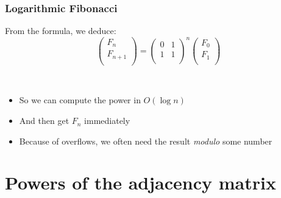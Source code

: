 \documentclass[12pt]{beamer}
\begin{document}
\begin{frame}
\frametitle{Logarithmic Fibonacci}
From the formula, we deduce:
\[
\left(
\begin{array}{cc}
F_n\\
F_{n+1}\\
\end{array}
\right)
=
\left(
\begin{array}{cc}
0&1\\
1&1\\
\end{array}
\right)^n
\left(
\begin{array}{cc}
F_0\\
F_1\\
\end{array}
\right)
\]

~

\begin{itemize}
\item So we can compute the power in $O(\log n)$
\item And then get $F_n$ immediately
\item Because of overflows, we often need the result \emph{modulo} some number
\end{itemize}
\end{frame}

\section{Powers of the adjacency matrix}

\newcommand{\adj}{\mathsf{adj}}
\newcommand{\np}{\mathsf{num\_path}}
\end{document}
